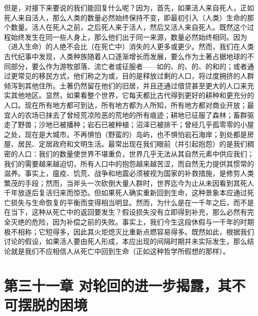 但是，对接下来要说的我们能回复什么呢？因为，首先，如果活人来自死人，正如死人来自活人，那么人类的数量必然始终保持不变，即最初引入（人类）生命的那个数量。活人在死人之前，之后死人来于活人，然后又活人来自死人。既然这个过程始终发生在同一些人身上，那么他们出于同一来源，数量必然始终相同。因为（进入生命）的人绝不会比（在死亡中）消失的人更多或更少。然而，我们在人类古代纪事中发现，人类种族随着人口逐渐增长而发展，要么作为土著占据地球的不同部分，要么作为游牧部落、流亡者或征服者——如的、的、的、的和的；或者通过更常见的移民方式，他们称之为或，目的是释放过剩的人口，将过度拥挤的人群倾泻到其他住所。土著仍然留在他们的旧居，并且还通过借贷甚至更大的人口来充实其他地区。显然，如果看整个世界，它每天都比古代得到更好的耕种和更充分的人口。现在所有地方都可到达，所有地方都为人所知，所有地方都对商业开放；最宜人的农场已抹去了曾经荒凉险恶的荒地的所有痕迹；耕地已征服了森林；畜群驱走了野兽；沙地已被播种；岩石已被种植；沼泽已被排干；曾经几乎孤零零的小屋之处，现在是大城市。不再惧怕（野蛮的）岛屿，也不惧怕岩石海岸；到处都是房屋、居民、定居政府和文明生活。最常出现在我们眼前（并引起抱怨）的是我们稠密的人口：我们的数量使世界不堪重负，世界几乎无法从其自然元素中供应我们；我们的需要越来越迫切，所有人口中的抱怨越来越苦涩，而自然无力提供其惯常的滋养。事实上，瘟疫、饥荒、战争和地震必须被视为国家的补救措施，是修剪人类繁茂的手段；然而，当斧头一次砍倒大量人群时，世界迄今为止从未因看到其死人千年放逐后复活归来而惊恐。但如果死人确实重新回到生命，这种景象本应通过死亡损失与生命恢复的平衡而变得相当明显。然而，为什么是在一千年之后，而不是在当下，这种从死亡中的返回要发生？假设损失没有立即得到补充，那么必然有完全灭绝的危险，因为补偿之前的失败。事实上，我们今生这段休假与一千年的时期极不相称；它短得多，因此其火炬熄灭比重新点燃容易得多。既然如此，根据我们讨论的假设，如果活人要由死人形成，本应出现的间隔时期并未实际发生，那么结论就是我们不应相信人从死亡中回到生命（正如这种哲学所假想的那样）。\par


\section{第三十一章 对轮回的进一步揭露，其不可摆脱的困境}

